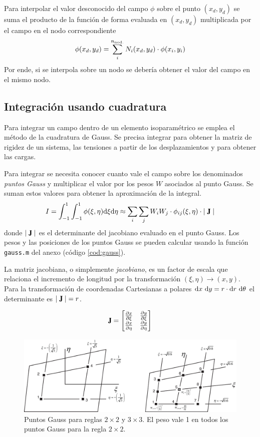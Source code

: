 Para interpolar el valor desconocido del campo $\phi$ sobre el punto $(x_d,y_d)$ se suma el producto de la función de forma evaluada en $(x_d,y_d)$ multiplicada por el campo en el nodo correspondiente
\[
\phi(x_d,y_d) = \sum_i^{n_{\mathrm{nod.}}} N_i(x_d,y_d) \cdot \phi(x_i,y_i) 
\]
Por ende, si se interpola sobre un nodo se debería obtener el valor del campo en el mismo nodo.


\subsection*{Integración usando cuadratura}
Para integrar un campo dentro de un elemento isoparamétrico se emplea el método de la cuadratura de Gauss. Se precisa integrar para obtener la matriz de rigidez de un sistema, las tensiones a partir de los desplazamientos y para obtener las cargas.

Para integrar se necesita conocer cuanto vale el campo sobre los denominados \textit{puntos Gauss} y multiplicar el valor por los pesos $W$ asociados al punto Gauss. Se suman estos valores para obtener la aproximación de la integral.
\begin{equation}
I=\int^1_{-1} \int^1_{-1}\phi(\xi,\eta) \di \xi \di \eta\approx \sum_i \sum_j W_i W_j \cdot \phi_{ij}(\xi,\eta) \cdot \Djac
\end{equation}
donde $\Djac$ es el determinante del jacobiano evaluado en el punto Gauss. Los pesos y las posiciones de los puntos Gauss se pueden calcular usando la función \texttt{gauss.m} del anexo (código \ref{cod:gauss}).

La matriz jacobiana, o simplemente \textit{jacobiano}, es un factor de escala que relaciona el incremento de longitud por la transformación $(\xi,\eta)\rightarrow(x,y)$. Para la transformación de coordenadas Cartesianas a polares $\textrm{d} x~ \textrm{d} y = r \cdot \textrm{d} r~  \textrm{d} \theta$ el determinante es $\Djac=r$.

\[
\jac = \begin{bmatrix}
\spartial{x}{\xi} & \spartial{y}{\xi} \\
\spartial{x}{\eta} & \spartial{y}{\eta}
\end{bmatrix}
\]

\begin{figure}[htb!]
	\centering
	\includegraphics[width=12cm]{fig/gauss_n3.eps}
	\caption{Puntos Gauss para reglas $2\times 2$ y $3\times3$. El peso vale 1 en todos los puntos Gauss para la regla $2\times2$.}
	\label{fig:gauss_n3}
\end{figure}



